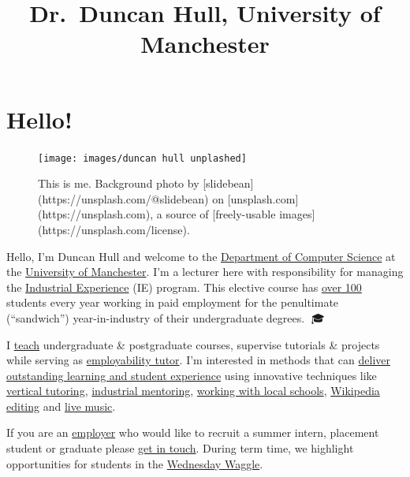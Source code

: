\documentclass[
  12pt,
]{book}
\title{Dr.~Duncan Hull, University of Manchester}
\author{}
\date{\vspace{-2.5em}}
\begin{document}
\maketitle

{
\setcounter{tocdepth}{1}
\tableofcontents
}
\hypertarget{hello}{%
\chapter*{Hello!}\label{hello}}

\begin{figure}

{\centering \texttt{[image: images/duncan hull unplashed]} 

}

\caption{This is me. Background photo by [slidebean](https://unsplash.com/@slidebean) on [unsplash.com](https://unsplash.com), a source of [freely-usable images](https://unsplash.com/license).}\label{fig:unsplashed-fig}
\end{figure}

Hello, I'm Duncan Hull and welcome to the \href{https://www.cs.manchester.ac.uk/}{Department of Computer Science} at the \href{https://www.manchester.ac.uk}{University of Manchester}. I'm a lecturer here with responsibility for managing the \href{https://www.cs.manchester.ac.uk/study/undergraduate/industrial-experience/}{Industrial Experience} (IE) program. This elective course has \protect\hyperlink{employability}{over 100} students every year working in paid employment for the penultimate (``sandwich'') year-in-industry of their undergraduate degrees. 🥪🎓

I \protect\hyperlink{teaching}{teach} undergraduate \& postgraduate courses, supervise tutorials \& projects while serving as \href{http://studentnet.cs.manchester.ac.uk/employment/placement/}{employability tutor}. I'm interested in methods that can \protect\hyperlink{research}{deliver outstanding learning and student experience} using innovative techniques like \protect\hyperlink{vertical-tutoring}{vertical tutoring}, \href{https://www.cs.manchester.ac.uk/connect/business-engagement/industrial-mentoring/}{industrial mentoring}, \protect\hyperlink{coding-their-future}{working with local schools}, \protect\hyperlink{wikipedia}{Wikipedia editing} and \protect\hyperlink{tuningcomplete}{live music}. 🎸

If you are an \protect\hyperlink{employers}{employer} who would like to recruit a summer intern, placement student or graduate please \protect\hyperlink{contact}{get in touch}. During term time, we highlight opportunities for students in the \href{https://waggle.cs.manchester.ac.uk/waggle/about}{Wednesday Waggle}. 🐝
\end{document}
